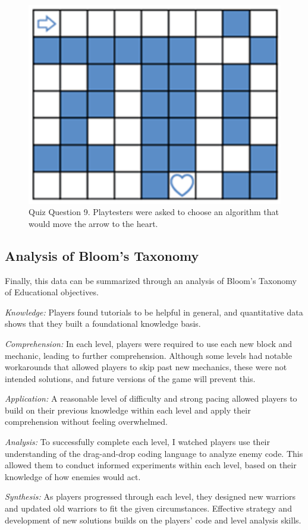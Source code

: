 \documentclass[10pt,twocolumn]{article}
\begin{document}
\begin{figure}
    \centering
    \includegraphics[width=0.5\linewidth]{images/move-robot.png}
    \caption{Quiz Question 9. Playtesters were asked to choose an algorithm that would move the arrow to the heart.}
    \label{fig:question-9}
\end{figure}

\subsection{Analysis of Bloom's Taxonomy}
Finally, this data can be summarized through an analysis of Bloom’s Taxonomy of Educational objectives.

\textit{Knowledge:} Players found tutorials to be helpful in general, and quantitative data shows that they built a foundational knowledge basis.

\textit{Comprehension:} In each level, players were required to use each new block and mechanic, leading to further comprehension. Although some levels had notable workarounds that allowed players to skip past new mechanics, these were not intended solutions, and future versions of the game will prevent this.

\textit{Application:} A reasonable level of difficulty and strong pacing allowed players to build on their previous knowledge within each level and apply their comprehension without feeling overwhelmed.

\textit{Analysis:} To successfully complete each level, I watched players use their understanding of the drag-and-drop coding language to analyze enemy code. This allowed them to conduct informed experiments within each level, based on their knowledge of how enemies would act.

\textit{Synthesis:} As players progressed through each level, they designed new warriors and updated old warriors to fit the given circumstances. Effective strategy and development of new solutions builds on the players’ code and level analysis skills.
\end{document}
